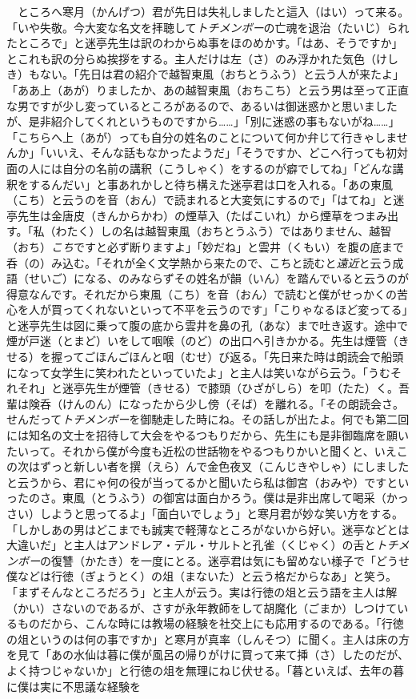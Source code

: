 　ところへ寒月（かんげつ）君が先日は失礼しましたと這入（はい）って来る。「いや失敬。今大変な名文を拝聴して\emph{トチメンボー}の亡魂を退治（たいじ）られたところで」と迷亭先生は訳のわからぬ事をほのめかす。「はあ、そうですか」とこれも訳の分らぬ挨拶をする。主人だけは左（さ）のみ浮かれた気色（けしき）もない。「先日は君の紹介で越智東風（おちとうふう）と云う人が来たよ」「ああ上（あが）りましたか、あの越智東風（おちこち）と云う男は至って正直な男ですが少し変っているところがあるので、あるいは御迷惑かと思いましたが、是非紹介してくれというものですから\ldots{}\ldots{}」「別に迷惑の事もないがね\ldots{}\ldots{}」「こちらへ上（あが）っても自分の姓名のことについて何か弁じて行きゃしませんか」「いいえ、そんな話もなかったようだ」「そうですか、どこへ行っても初対面の人には自分の名前の講釈（こうしゃく）をするのが癖でしてね」「どんな講釈をするんだい」と事あれかしと待ち構えた迷亭君は口を入れる。「あの東風（こち）と云うのを音（おん）で読まれると大変気にするので」「はてね」と迷亭先生は金唐皮（きんからかわ）の煙草入（たばこいれ）から煙草をつまみ出す。「私（わたく）しの名は越智東風（おちとうふう）ではありません、越智（おち）\emph{こち}ですと必ず断りますよ」「妙だね」と雲井（くもい）を腹の底まで呑（の）み込む。「それが全く文学熱から来たので、こちと読むと\emph{遠近}と云う成語（せいご）になる、のみならずその姓名が韻（いん）を踏んでいると云うのが得意なんです。それだから東風（こち）を音（おん）で読むと僕がせっかくの苦心を人が買ってくれないといって不平を云うのです」「こりゃなるほど変ってる」と迷亭先生は図に乗って腹の底から雲井を鼻の孔（あな）まで吐き返す。途中で煙が戸迷（とまど）いをして咽喉（のど）の出口へ引きかかる。先生は煙管（きせる）を握ってごほんごほんと咽（むせ）び返る。「先日来た時は朗読会で船頭になって女学生に笑われたといっていたよ」と主人は笑いながら云う。「うむそれそれ」と迷亭先生が煙管（きせる）で膝頭（ひざがしら）を叩（たた）く。吾輩は険呑（けんのん）になったから少し傍（そば）を離れる。「その朗読会さ。せんだって\emph{トチメンボー}を御馳走した時にね。その話しが出たよ。何でも第二回には知名の文士を招待して大会をやるつもりだから、先生にも是非御臨席を願いたいって。それから僕が今度も近松の世話物をやるつもりかいと聞くと、いえこの次はずっと新しい者を撰（えら）んで金色夜叉（こんじきやしゃ）にしましたと云うから、君にゃ何の役が当ってるかと聞いたら私は御宮（おみや）ですといったのさ。東風（とうふう）の御宮は面白かろう。僕は是非出席して喝采（かっさい）しようと思ってるよ」「面白いでしょう」と寒月君が妙な笑い方をする。「しかしあの男はどこまでも誠実で軽薄なところがないから好い。迷亭などとは大違いだ」と主人はアンドレア・デル・サルトと孔雀（くじゃく）の舌と\emph{トチメンボー}の復讐（かたき）を一度にとる。迷亭君は気にも留めない様子で「どうせ僕などは行徳（ぎょうとく）の俎（まないた）と云う格だからなあ」と笑う。「まずそんなところだろう」と主人が云う。実は行徳の俎と云う語を主人は解（かい）さないのであるが、さすが永年教師をして胡魔化（ごまか）しつけているものだから、こんな時には教場の経験を社交上にも応用するのである。「行徳の俎というのは何の事ですか」と寒月が真率（しんそつ）に聞く。主人は床の方を見て「あの水仙は暮に僕が風呂の帰りがけに買って来て挿（さ）したのだが、よく持つじゃないか」と行徳の俎を無理にねじ伏せる。「暮といえば、去年の暮に僕は実に不思議な経験を